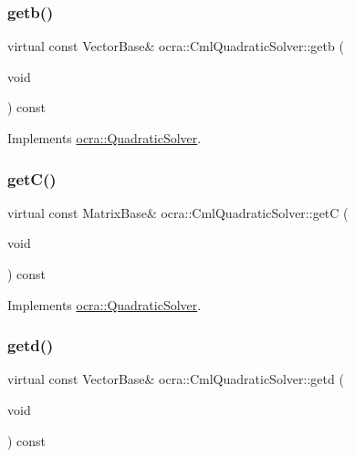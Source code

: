 \subsubsection{\texorpdfstring{getb()}{getb()}}
{\footnotesize\ttfamily virtual const Vector\+Base\& ocra\+::\+Cml\+Quadratic\+Solver\+::getb (\begin{DoxyParamCaption}\item[{void}]{ }\end{DoxyParamCaption}) const\hspace{0.3cm}{\ttfamily [virtual]}}



Implements \hyperlink{classocra_1_1QuadraticSolver_ac051c6a779ce6a6e6e6657cfd3e1f65f}{ocra\+::\+Quadratic\+Solver}.

\hypertarget{classocra_1_1CmlQuadraticSolver_a94c170188e1f3d00aaee5628e2501a64}{}\label{classocra_1_1CmlQuadraticSolver_a94c170188e1f3d00aaee5628e2501a64} 
\subsubsection{\texorpdfstring{get\+C()}{getC()}}
{\footnotesize\ttfamily virtual const Matrix\+Base\& ocra\+::\+Cml\+Quadratic\+Solver\+::getC (\begin{DoxyParamCaption}\item[{void}]{ }\end{DoxyParamCaption}) const\hspace{0.3cm}{\ttfamily [virtual]}}



Implements \hyperlink{classocra_1_1QuadraticSolver_a0babcde3ffe8770131b5f842da01c49c}{ocra\+::\+Quadratic\+Solver}.

\hypertarget{classocra_1_1CmlQuadraticSolver_a0d3fd75da9a338208f7a5f5e1417346b}{}\label{classocra_1_1CmlQuadraticSolver_a0d3fd75da9a338208f7a5f5e1417346b} 
\subsubsection{\texorpdfstring{getd()}{getd()}}
{\footnotesize\ttfamily virtual const Vector\+Base\& ocra\+::\+Cml\+Quadratic\+Solver\+::getd (\begin{DoxyParamCaption}\item[{void}]{ }\end{DoxyParamCaption}) const\hspace{0.3cm}{\ttfamily [virtual]}}



